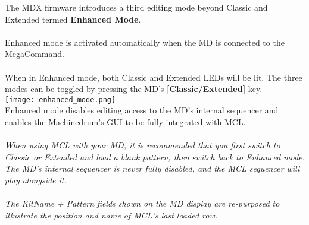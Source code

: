 The MDX firmware introduces a third editing mode beyond Classic and Extended termed \textbf{Enhanced Mode}.\\
\\
Enhanced mode is activated automatically when the MD is connected to the MegaCommand.\\
\\
When in Enhanced mode, both Classic and Extended LEDs will be lit. The three modes can be toggled by pressing the MD's \textbf{[Classic/Extended]} key.\\
\texttt{[image: enhanced\_mode.png]}\\
Enhanced mode disables editing access to the MD's internal sequencer and enables the Machinedrum's GUI to be fully integrated with MCL.
\\\\
\textit{When using MCL with your MD, it is recommended that you first switch to Classic or Extended and load a blank pattern, then switch back to Enhanced mode. The MD's internal sequencer is never fully disabled, and the MCL sequencer will play alongside it.\\\\
The KitName + Pattern fields shown on the MD display are re-purposed to illustrate the position and name of MCL's last loaded row.
}
\newpage
